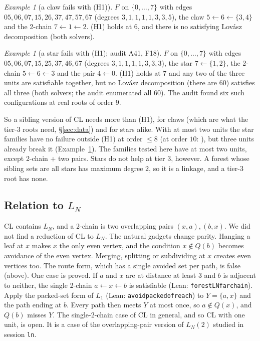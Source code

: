 \documentclass[11pt]{amsart}
\theoremstyle{definition}
\theoremstyle{remark}
\newtheorem{example}[theorem]{Example}
\renewcommand{\_}{\oldunderscore\allowbreak}
\newcommand{\lean}[1]{\textup{(Lean: {\small\texttt{#1}})}}
\begin{document}
\begin{example}[a claw fails with (H1)]
$F$ on $\{0,\dots,7\}$ with edges $05,06,07,15,26,37,47,57,67$ (degrees $3,1,1,1,1,3,3,5$), the claw
$5\leftarrow6\leftarrow\{3,4\}$ and the 2-chain $7\leftarrow1\leftarrow2$. (H1) holds at $6$, and
there is no satisfying Lov\'asz decomposition (both solvers).
\end{example}

\begin{example}[a star fails with (H1); audit A41, F18]\label{ex:star3}
$F$ on $\{0,\dots,7\}$ with edges $05,06,07,15,25,37,46,67$ (degrees $3,1,1,1,1,3,3,3$), the star
$7\leftarrow\{1,2\}$, the 2-chain $5\leftarrow6\leftarrow3$ and the pair $4\leftarrow0$. (H1) holds at
$7$ and any two of the three units are satisfiable together, but no Lov\'asz decomposition (there
are $60$) satisfies all three (both solvers; the audit enumerated all $60$). The audit found six
such configurations at real roots of order $9$.
\end{example}

So a sibling version of CL needs more than (H1), for claws (which are what the tier-3 roots need,
\S\ref{sec:data}) and for stars alike. With at most two units the star families have no failure
outside (H1) at order $\le8$ (at order $10$: \FLSTARTEN), but three units already break it
(Example~\ref{ex:star3}). The families tested here have at most two units, except
2-chain + two pairs. Stars do not help at tier $3$, however. A forest whose sibling sets are all stars has
maximum degree $2$, so it is a linkage, and a tier-3 root has none.

\subsection{Relation to \texorpdfstring{$L_N$}{L\_N}}
CL contains $L_N$, and a 2-chain is two overlapping pairs $(x,a),(b,x)$. We did not find a
reduction of CL to $L_N$. The natural gadgets change parity. Hanging a leaf at $x$ makes $x$ the
only even vertex, and the condition $x\notin Q(b)$ becomes avoidance of the even vertex. Merging,
splitting or subdividing at $x$ creates even vertices too. The route form, which has a single
avoided set per path, is false (above). One case is proved. If $a$ and $x$ are at distance at least $3$ and $b$ is adjacent to neither,
the single 2-chain $a\leftarrow x\leftarrow b$ is satisfiable \lean{forestLN\_far\_chain}. Apply the
packed-set form of $L_1$ \lean{avoid\_packed\_of\_reach} to $Y=\{a,x\}$ and the path ending at
$b$. Every path then meets $Y$ at most once, so $a\notin Q(x)$, and $Q(b)$ misses $Y$. The
single-2-chain case of CL in general, and so CL with one unit, is open. It is a case of the
overlapping-pair version of $L_N(2)$ studied in session \texttt{ln}.
\end{document}
